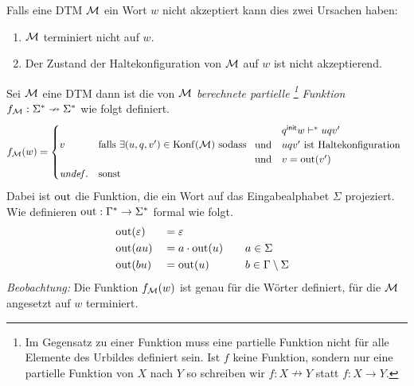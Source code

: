 Falls eine \ac{DTM} $\mathcal{M}$ ein Wort $w$ nicht akzeptiert kann dies zwei Ursachen haben:
\begin{enumerate}
 \item $\mathcal{M}$ terminiert nicht auf $w$.
 \item Der Zustand der Haltekonfiguration von $\mathcal{M}$ auf $w$ ist nicht akzeptierend.
\end{enumerate}


\begin{Def} %
Sei $\mathcal{M}$ eine \ac{DTM} dann ist die von $\mathcal{M}$ \emph{berechnete partielle
\footnote{Im Gegensatz zu einer Funktion muss eine partielle Funktion nicht für alle Elemente des Urbildes definiert sein.
Ist $f$ keine Funktion, sondern nur eine partielle Funktion von $X$ nach $Y$ so schreiben wir $f: X\nrightarrow Y$ statt $f: X\rightarrow Y$. }
Funktion} $f_{\mathcal{M}}:\Sigma^*\nrightarrow\Sigma^*$ wie folgt definiert.
$$
f_{\mathcal{M}}(w)= 
\begin{cases}
 v &\text{falls } \exists (u,q,v')\in \operatorname{Konf}(\mathcal{M}) \text{ sodass }
 \begin{array}{ll}
  & q^\mathsf{init} w \vdash^*uqv'\\
  \text{und} & uqv'\text{ ist Haltekonfiguration}\\
  \text{und} & v=\operatorname{out}( v')
 \end{array}
\\
 \mathit{undef.} & \text{sonst}
\end{cases}
$$
Dabei ist $\operatorname{out}$ die Funktion, die ein Wort auf das Eingabealphabet $\Sigma$ projeziert. 
Wie definieren $\out:\Gamma^* \-> \Sigma^*$ formal wie folgt.
	\begin{alignat*}{3}
		&\operatorname{out}(\varepsilon) &&= \varepsilon\\
		&\operatorname{out}(au) &&= a\cdot\operatorname{out}(u) &\quad& a\in\Sigma\\
		&\operatorname{out}(bu) &&= \operatorname{out}(u) && b\in\Gamma\setminus\Sigma
	\end{alignat*}
\emph{Beobachtung:} Die Funktion $f_{\mathcal{M}}(w)$ ist genau für die Wörter definiert, 
für die $\mathcal{M}$ angesetzt auf $w$ terminiert.
\end{Def}

